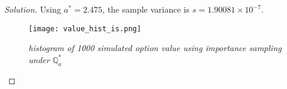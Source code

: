 \documentclass[10pt]{article}
\newcommand{\Q}{\mathbb{Q}}
\begin{document}
\begin{proof}[Solution]
    Using $a^* = 2.475$, the sample variance is $s = 1.90081 \times 10^{-7}$.
    \begin{figure}[H]
        \begin{center}
            \texttt{[image: value\_hist\_is.png]}
            \caption{\textit{histogram of 1000 simulated option value using importance sampling under $\Q_a^*$}}
            \label{fig:value_hist_is}
        \end{center}
    \end{figure}
\end{proof}
\end{document}
